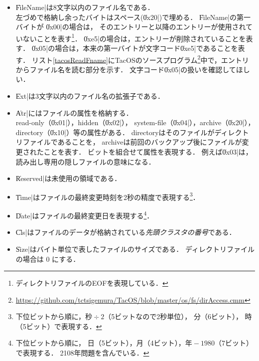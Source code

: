 \begin{itemize}
\item \|FileName|は8文字以内のファイル名である．\\
  左づめで格納し余ったバイトはスペース(\|0x20|)で埋める．
  \|FileName|の第一バイトが
  \|0x00|の場合は，
  そのエントリーと以降のエントリーが使用されていないことを表す\footnote{
    ディレクトリファイルのEOFを表現している．}．
  \|0xe5|の場合は，エントリーが削除されていることを表す．
  \|0x05|の場合は，本来の第一バイトが文字コード\|0xe5|であることを表す．
  リスト\ref{tacosReadFname}にTacOSのソースプログラム\footnote{
    \url{https://github.com/tctsigemura/TacOS/blob/master/os/fs/dirAccess.cmm}
  }中で，エントリからファイル名を読む部分を示す．
  文字コード\|0x05|の扱いを確認してほしい．

\item \|Ext|は3文字以内のファイル名の拡張子である．

\item \|Atr|にはファイルの属性を格納する．\\
  read-only（\|0x01|），hidden（\|0x02|），
  system-file（\|0x04|），archive（\|0x20|），
  directory（\|0x10|）等の属性がある．
  directoryはそのファイルがディレクトリファイルであることを，
  archiveは前回のバックアップ後にファイルが変更されたことを表す．
  ビットを組合せて属性を表現する．
  例えば\|0x03|は，読み出し専用の隠しファイルの意味になる．

\item \|Reserved|は未使用の領域である．

\item \|Time|はファイルの最終変更時刻を2秒の精度で表現する\footnote{
  下位ビットから順に，$秒 \div 2$（5ビットなので2秒単位），
  分（6ビット），
  時（5ビット）で表現する．}．

\item \|Date|はファイルの最終変更日を表現する\footnote{下位ビットから順に，
  日（5ビット），月（4ビット），$年-1980$（7ビット）で表現する．
  2108年問題を含んでいる．}．

\item \|Cls|はファイルのデータが格納されている\emph{先頭クラスタの番号}である．
  
\item \|Size|はバイト単位で表したファイルのサイズである．
  ディレクトリファイルの場合は 0 にする．
\end{itemize}



